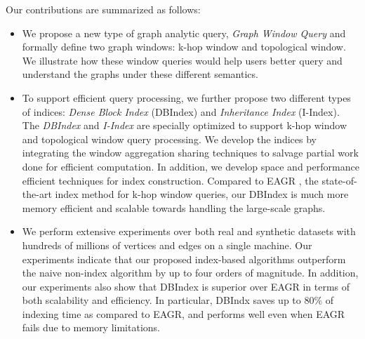  
Our contributions are summarized as follows:
\begin{itemize}
\item{We propose a new type of graph analytic query, \emph{Graph Window Query} and formally define two graph windows: k-hop window and topological window. We illustrate how these window queries would help users better query and
understand the graphs under these different semantics.}

\item{ To support efficient query processing, we further propose two different types of indices: \emph{Dense Block Index} (DBIndex) and \emph{Inheritance Index} (I-Index). The
\emph{DBIndex} and \emph{I-Index} are specially 
optimized to support k-hop window and topological window query processing. 
We develop the indices by integrating the window aggregation sharing techniques to salvage partial work done for efficient computation. In addition, we develop space and performance efficient techniques for index construction. 
Compared to EAGR \cite{mondal2014eagr}, the state-of-the-art index method for k-hop window queries, our DBIndex is much more memory efficient and scalable towards handling the large-scale graphs. }

\item{We perform extensive experiments over both real and synthetic datasets
with hundreds of millions of vertices and edges on a single machine. Our experiments 
indicate that our proposed index-based algorithms outperform the naive non-index
algorithm 
by up to four orders of magnitude. In addition, our experiments also show 
that DBIndex is superior over EAGR in terms of both
scalability and efficiency. In particular, 
DBIndx saves up to 80\% of indexing time as 
compared to EAGR, 
and performs well even when EAGR fails due
to memory limitations. 
}
\end{itemize}
